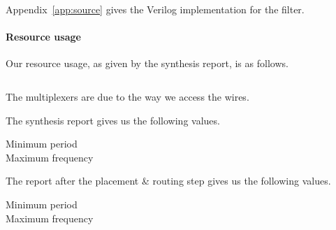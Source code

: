 Appendix~\ref{app:source} gives the Verilog implementation for the filter.

\paragraph{Resource usage}
Our resource usage, as given by the synthesis report, is as follows.

\begin{verbatim}
\end{verbatim}


The multiplexers are due to the way we access the wires.

The synthesis report gives us the following values.
\begin{description}
	\item[Minimum period]
	\item[Maximum frequency]
\end{description}

The report after the placement \& routing step gives us the following values.
\begin{description}
	\item[Minimum period]
	\item[Maximum frequency]
\end{description}
